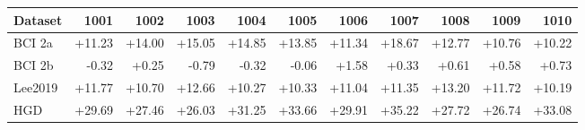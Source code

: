 \begin{tabular}{@{}lrrrrrrrrrr@{}}
\toprule
Dataset & 1001 & 1002 & 1003 & 1004 & 1005 & 1006 & 1007 & 1008 & 1009 & 1010 \\
\midrule
BCI 2a & +11.23 & +14.00 & +15.05 & +14.85 & +13.85 & +11.34 & +18.67 & +12.77 & +10.76 & +10.22 \\
BCI 2b & -0.32 & +0.25 & -0.79 & -0.32 & -0.06 & +1.58 & +0.33 & +0.61 & +0.58 & +0.73 \\
Lee2019 & +11.77 & +10.70 & +12.66 & +10.27 & +10.33 & +11.04 & +11.35 & +13.20 & +11.72 & +10.19 \\
HGD & +29.69 & +27.46 & +26.03 & +31.25 & +33.66 & +29.91 & +35.22 & +27.72 & +26.74 & +33.08 \\
\bottomrule
\end{tabular}

